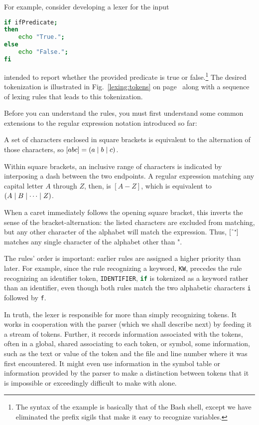 For example, consider developing a lexer for the input
\begin{lstlisting}[language=bash]
if ifPredicate; 
then
    echo "True.";
else
    echo "False.";
fi
\end{lstlisting}
intended to report whether the provided predicate is true or false.\footnote{The syntax of the example is basically that of the Bash shell, except we have eliminated the prefix sigils that make it easy to recognize variables.} The desired tokenization is illustrated in Fig.~\ref{lexing:tokens} on page~\pageref{lexing:tokens} along with a sequence of lexing rules that leads to this tokenization.

Before you can understand the rules, you must first understand some common extensions to the regular expression notation introduced so far:
\begin{aenumerate}
\item A set of characters enclosed in square brackets is equivalent to the alternation of those characters, so $[abc] = (a \mid b \mid c)$.

\item Within square brackets, an inclusive range of characters is indicated by interposing a dash between the two endpoints. A regular expression matching any capital letter $A$ through $Z$, then, is $[A-Z]$, which is equivalent to $(A \mid B \mid \dotsb \mid Z)$.

\item When a caret immediately follows the opening square bracket, this inverts the sense of the bracket-alternation: the listed characters are excluded from matching, but any other character of the alphabet will match the expression. Thus, $[\hat{\hphantom{\text{\mt{"}}}}\text{\small"}]$ matches any single character of the alphabet other than {\small"}.
\end{aenumerate}



The rules' order is important: earlier rules are assigned a higher priority than later. For example, since the rule recognizing a keyword, \lstinline[language=flex]{KW}, precedes the rule recognizing an identifier token, \lstinline[language=flex]{IDENTIFIER}, \lstinline[language=bash]{if} is tokenized as a keyword rather than an identifier, even though both rules match the two alphabetic characters \lstinline[language=bash]{i} followed by \lstinline[language=bash]{f}.

In truth, the lexer is responsible for more than simply recognizing tokens. It works in cooperation with the parser (which we shall describe next) by feeding it a stream of tokens. Further, it records information associated with the tokens, often in a global, shared  associating to each token, or symbol, some information, such as the text or value of the token and the file and line number where it was first encountered. It might even use information in the symbol table or information provided by the parser to make a distinction between tokens that it is impossible or exceedingly difficult to make with \regexes alone.

